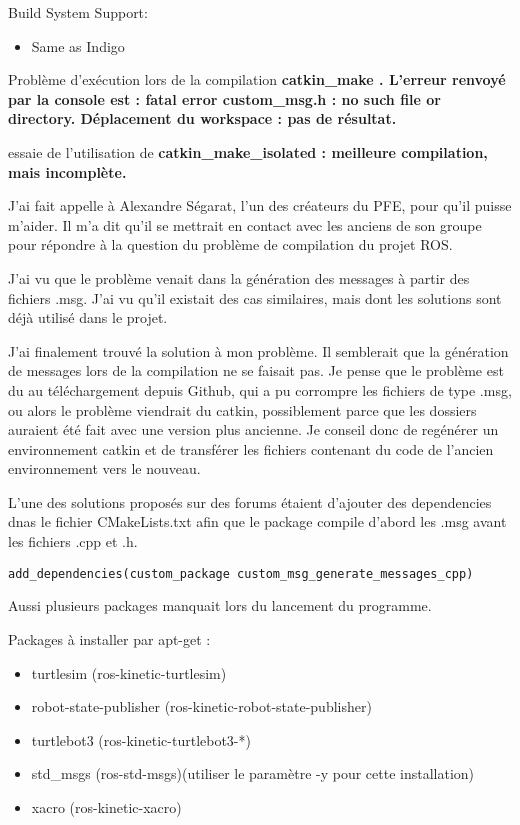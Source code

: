 \documentclass[a4paper]{report}
\begin{document}
    Build System Support:

    \begin{itemize}
        \item Same as Indigo
    \end{itemize}

    \vspace{0.5cm}

    Problème d'exécution lors de la compilation \bfseries catkin\_make \mdseries. L'erreur renvoyé par la console est : \textbf{\color{red} fatal error \color{black} custom\_msg.h : no such file or directory}.
    Déplacement du workspace : pas de résultat.

    essaie de l'utilisation de \bfseries catkin\_make\_isolated \mdseries : meilleure compilation, mais incomplète.

    J'ai fait appelle à Alexandre Ségarat, l'un des créateurs du PFE, pour qu'il puisse m'aider. Il m'a dit qu'il se mettrait en contact avec les anciens de son groupe pour répondre à la question du problème de compilation du projet ROS.


    J'ai vu que le problème venait dans la génération des messages à partir des fichiers .msg. J'ai vu qu'il existait des cas similaires, mais dont les solutions sont déjà utilisé dans le projet.

    J'ai finalement trouvé la solution à mon problème. Il semblerait que la génération de messages lors de la compilation ne se faisait pas. Je pense que le problème est du au téléchargement depuis Github, qui a pu corrompre les fichiers de type .msg, ou alors le problème viendrait du catkin, possiblement parce que les dossiers auraient été fait avec une version plus ancienne. Je conseil donc de regénérer un environnement catkin et de transférer les fichiers contenant du code de l'ancien environnement vers le nouveau.

    L'une des solutions proposés sur des forums étaient d'ajouter des dependencies dnas le fichier CMakeLists.txt afin que le package compile d'abord les .msg avant les fichiers .cpp et .h.

    \vspace{0.5cm}
    \begin{lstlisting}[sh]
        add_dependencies(custom_package custom_msg_generate_messages_cpp)
    \end{lstlisting}
    \vspace{0.5cm}
    Aussi plusieurs packages manquait lors du lancement du programme.

    Packages à installer par apt-get :
    \begin{itemize}
        \item turtlesim (ros-kinetic-turtlesim)
        \item robot-state-publisher (ros-kinetic-robot-state-publisher)
        \item turtlebot3 (ros-kinetic-turtlebot3-*)
        \item std\_msgs (ros-std-msgs)(utiliser le paramètre -y pour cette installation)
        \item xacro (ros-kinetic-xacro)
    \end{itemize}
\end{document}
